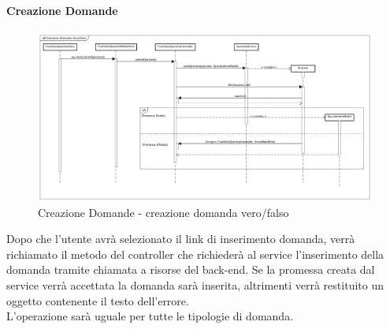 \paragraph{Creazione Domande}

\label{Creazione Domande - creazione domanda vero/falso}

\begin{figure}[ht]
	\centering
	\includegraphics[scale=0.25,keepaspectratio]{UML/DiagrammiDiSequenza/Front-End/TrueFalseQuestionCreation.png}
	\caption{Creazione Domande - creazione domanda vero/falso}
\end{figure} \FloatBarrier

Dopo che l'utente avrà selezionato il link di inserimento domanda, verrà richiamato il metodo del controller che richiederà al service l'inserimento della domanda tramite chiamata a risorse del back-end. Se la promessa creata dal service verrà accettata la domanda sarà inserita, altrimenti verrà restituito un oggetto contenente il testo dell'errore. \\ L'operazione sarà uguale per tutte le tipologie di domanda. 